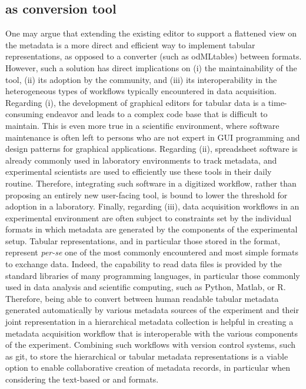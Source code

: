 \subsection{ as conversion tool}
One may argue that extending the existing  editor to support a flattened view on the metadata is a more direct and efficient way to implement tabular representations, as opposed to a converter (such as odMLtables) between formats. However, such a solution has direct implications on (i) the maintainability of the tool, (ii) its adoption by the community, and (iii) its interoperability in the heterogeneous types of workflows typically encountered in data acquisition. Regarding (i), the development of graphical editors for tabular data  is a time-consuming endeavor and leads to a complex code base that is difficult to maintain. This is even more true in a scientific environment, where software maintenance is often left to persons who are not expert in GUI programming and design patterns for graphical applications. Regarding (ii), spreadsheet software is already commonly used in laboratory environments to track metadata, and experimental scientists are used to efficiently use these tools in their daily routine. Therefore, integrating such software in a digitized workflow, rather than proposing an entirely new user-facing tool, is bound to lower the threshold for adoption in a laboratory. Finally, regarding (iii), data acquisition workflows in an experimental environment are often subject to constraints set by the individual formats in which metadata are generated by the components of the experimental setup. Tabular representations, and in particular those stored in the  format, represent \textit{per-se} one of the most commonly encountered and most simple formats to exchange data. Indeed, the capability to read  data files is provided by the standard libraries of many programming languages, in particular those commonly used in data analysis and scientific computing, such as Python, Matlab, or R. Therefore, being able to convert between human readable tabular metadata generated automatically by various metadata sources of the experiment and their joint representation in a hierarchical  metadata collection is helpful in creating a metadata acquisition workflow that is interoperable with the various components of the experiment. Combining such workflows with version control systems, such as git, to store the hierarchical or tabular metadata representations is a viable option to enable collaborative creation of metadata records, in particular when considering the text-based  or and  formats.

